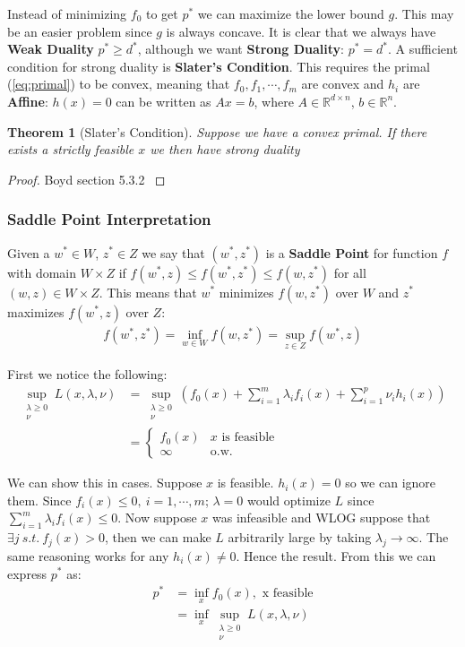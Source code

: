 \documentclass[]{article}
\theoremstyle{mattstyle}
\newtheorem{theorem}{Theorem}[section]
\theoremstyle{definition}
\begin{document}
Instead of minimizing $f_0$ to get $p^*$ we can maximize the lower bound $g$. This may be an easier problem since $g$ is always concave. It is clear that we always have \textbf{Weak Duality} $p^* \ge d^*$, although we want \textbf{Strong Duality}: $p^* = d^*$. A sufficient condition for strong duality is \textbf{Slater's Condition}. This requires the primal (\ref{eq:primal}) to be convex, meaning that $f_0, f_1, \cdots, f_m$ are convex and $h_i$ are \textbf{Affine}: $h(x) = 0$ can be written as $Ax = b$, where $A \in \mathbb{R}^{d \times n}$, $b\in\mathbb{R}^n$.

\begin{theorem}[Slater's Condition]
	Suppose we have a convex primal. If there exists a strictly feasible $x$ we then have strong duality
\end{theorem}
\begin{proof}
	Boyd section 5.3.2 \cite{Boyd:2004:CO:993483}
\end{proof}

\subsubsection{Saddle Point Interpretation}

Given a $w^*\in W$, $z^*\in Z$ we say that $(w^*,z^*)$ is a \textbf{Saddle Point} for function $f$ with domain $W \times Z$ if $f(w^*, z) \le f(w^*, z^*) \le f(w, z^*)$ for all $(w,z) \in W \times Z$. This means that $w^*$ minimizes $f(w, z^*)$ over $W$ and $z^*$ maximizes $f(w^*, z)$ over $Z$:
\begin{align*}
f(w^*, z^*) = \inf_{w \in W} f(w, z^*) = \sup_{z \in Z} f(w^*, z)
\end{align*}

First we notice the following:
\begin{align*}
\sup\limits_{\substack{\lambda\ge0 \\ \nu}} L(x, \lambda, \nu) &= \sup\limits_{\substack{\lambda\ge0 \\ \nu}} \left( f_0(x) + \sum_{i=1}^m \lambda_if_i(x) + \sum_{i=1}^p \nu_i h_i(x) \right)\\
&= \begin{cases}
f_0(x) & \text{$x$ is feasible}\\
\infty & \text{o.w.}
\end{cases}
\end{align*}

We can show this in cases. Suppose $x$ is feasible. $h_i(x)=0$ so we can ignore them. Since $f_i(x) \le 0,\ i=1, \cdots, m$; $\lambda = 0$ would optimize $L$ since $\sum_{i=1}^m \lambda_if_i(x) \le 0$. Now suppose $x$ was infeasible and WLOG suppose that $ \exists j \ s.t.\ f_j(x) > 0$, then we can make $L$ arbitrarily large by taking $\lambda_j \rightarrow \infty$. The same reasoning works for any $h_i(x) \ne 0$. Hence the result. From this we can express $p^*$ as:
\begin{align*}
p^* &= \inf_x f_0(x), \text{  x feasible}\\
&= \inf_x\sup_{\substack{\lambda\ge0 \\ \nu}}L(x, \lambda, \nu)
\end{align*}
\end{document}
